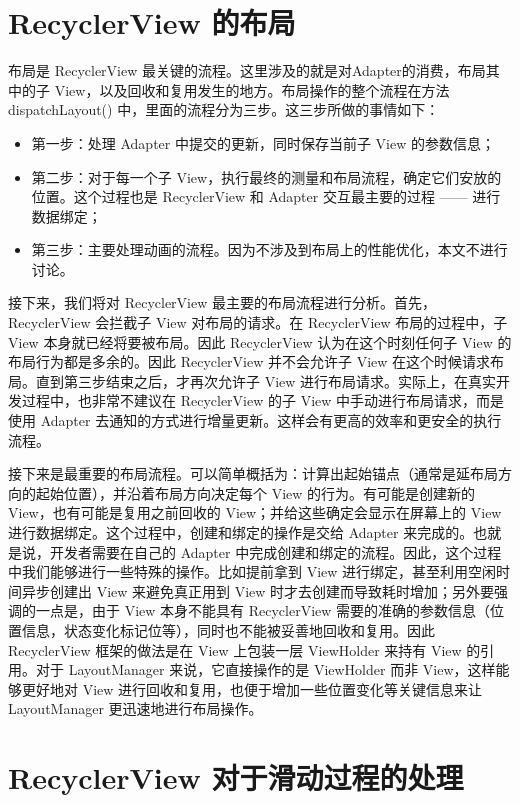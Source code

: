 \section{RecyclerView 的布局}

布局是 RecyclerView 最关键的流程。这里涉及的就是对Adapter的消费，布局其中的子 View，以及回收和复用发生的地方。布局操作的整个流程在方法 dispatchLayout() 中，里面的流程分为三步。这三步所做的事情如下：

\begin{itemize}
    \item 第一步：处理 Adapter 中提交的更新，同时保存当前子 View 的参数信息；
    \item 第二步：对于每一个子 View，执行最终的测量和布局流程，确定它们安放的位置。这个过程也是 RecyclerView 和 Adapter 交互最主要的过程 —— 进行数据绑定；
    \item 第三步：主要处理动画的流程。因为不涉及到布局上的性能优化，本文不进行讨论。
\end{itemize}

接下来，我们将对 RecyclerView 最主要的布局流程进行分析。首先，RecyclerView 会拦截子 View 对布局的请求。在 RecyclerView 布局的过程中，子 View 本身就已经将要被布局。因此 RecyclerView 认为在这个时刻任何子 View 的布局行为都是多余的。因此 RecyclerView 并不会允许子 View 在这个时候请求布局。直到第三步结束之后，才再次允许子 View 进行布局请求。实际上，在真实开发过程中，也非常不建议在 RecyclerView 的子 View 中手动进行布局请求，而是使用 Adapter 去通知的方式进行增量更新。这样会有更高的效率和更安全的执行流程。

接下来是最重要的布局流程。可以简单概括为：计算出起始锚点（通常是延布局方向的起始位置），并沿着布局方向决定每个 View 的行为。有可能是创建新的 View，也有可能是复用之前回收的 View；并给这些确定会显示在屏幕上的 View 进行数据绑定。这个过程中，创建和绑定的操作是交给 Adapter 来完成的。也就是说，开发者需要在自己的 Adapter 中完成创建和绑定的流程。因此，这个过程中我们能够进行一些特殊的操作。比如提前拿到 View 进行绑定，甚至利用空闲时间异步创建出 View 来避免真正用到 View 时才去创建而导致耗时增加；另外要强调的一点是，由于 View 本身不能具有 RecyclerView 需要的准确的参数信息（位置信息，状态变化标记位等），同时也不能被妥善地回收和复用。因此 RecyclerView 框架的做法是在 View 上包装一层 ViewHolder 来持有 View 的引用。对于 LayoutManager 来说，它直接操作的是 ViewHolder 而非 View，这样能够更好地对 View 进行回收和复用，也便于增加一些位置变化等关键信息来让 LayoutManager 更迅速地进行布局操作。

\section{RecyclerView 对于滑动过程的处理}

